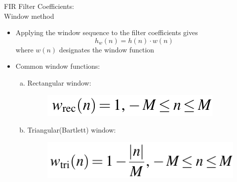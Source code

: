\documentclass[pdflatex,compress,mathserif]{beamer}
\begin{document}
\begin{frame}{FIR Filter Coefficients:\\Window method}
    \begin{itemize}
        \item Applying the window sequence to the filter coefficients gives $$ h_w(n) = h(n) \cdot w(n) $$ where $w(n)$ designates the window function
        \item Common window functions:
        \begin{enumerate}[a.]
            \item Rectangular window:
            \begin{figure}
                \centering
                \includegraphics[width=0.5\linewidth]{./img/img18.png}
            \end{figure}
            \item Triangular(Bartlett) window:
            \begin{figure}
                \centering
                \includegraphics[width=0.5\linewidth]{./img/img19.png}
            \end{figure}
        \end{enumerate}
    \end{itemize}
\end{frame}
\end{document}
